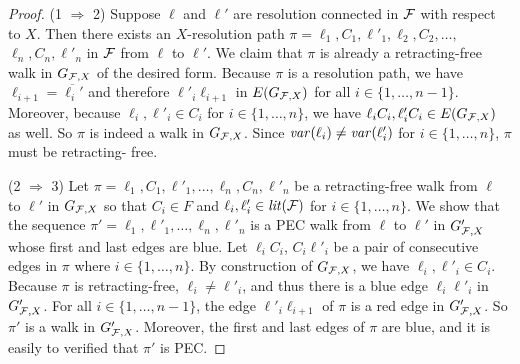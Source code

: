 \documentclass{llncs}
\def\hy{\hbox{-}\nobreak\hskip0pt} \newcommand{\ellipsis}{$\dots$}
\begin{document}
\begin{proof}
  (1 $\Rightarrow$ 2) Suppose $\ell$ and $\ell'$ are resolution connected in $\mathcal{F}$
  with respect to $X$. Then there exists an $X$\hy resolution path $\pi =
  \ell_1,C_1,\ell'_1,\ell_2,C_2,\dots,$\hskip 0pt$\ell_n,C_n,\ell'_n$ in
  $\mathcal{F}$ from $\ell$ to $\ell'$. We claim that $\pi$ is already a
  retracting\hy free walk in $G_{\mathcal{F},X}$ of the desired form. Because $\pi$
  is a resolution path, we have $\ell_{i+1} = \overline{\ell_i'}$ and
  therefore $\ell'_i\ell_{i+1}$ in $E(G_{\mathcal{F}, X})$ for all $i \in \{ 1,
  \dots, n-1 \}$. Moreover, because $\ell_i,\ell'_i \in C_i$ for $i \in \{
  1, \dots, n \}$, we have $\ell_iC_i, \ell'_iC_i \in E(G_{\mathcal{F}, X})$ as
  well. So $\pi$ is indeed a walk in $G_{\mathcal{F},X}$. Since $\mathit{var}(\ell_i) \neq
  \mathit{var}(\ell'_i)$ for $i \in \{ 1, \dots, n \}$, $\pi$ must be retracting\hy
  free.

  (2 $\Rightarrow$ 3) Let $\pi = \ell_1, C_1, \ell'_1, \dots, \ell_n,C_n,
  \ell'_n$ be a retracting\hy free walk from $\ell$ to $\ell'$ in $G_{\mathcal{F},X}$
  so that $C_i \in F$ and $\ell_i, \ell'_i \in \mathit{lit}(\mathcal{F})$ for $i \in \{ 1,
  \dots, n \}$. We show that the sequence $\pi' = \ell_1, \ell'_1, \dots,
  \ell_n,\ell'_n$ is a PEC walk from $\ell$ to $\ell'$ in
  $G'_{\mathcal{F},X}$ whose first and last edges are blue. Let $\ell_iC_i$,
  $C_i\ell'_i$ be a pair of consecutive edges in $\pi$ where $i \in \{ 1,
  \dots, n \}$. By construction of $G_{\mathcal{F},X}$, we have $\ell_i,\ell'_i \in
  C_i$. Because $\pi$ is retracting\hy free, $\ell_i \neq \ell'_i$, and thus
  there is a blue edge $\ell_i\ell'_i$ in $G'_{\mathcal{F},X}$. For all $i \in \{1,
  \dots, n-1\}$, the edge $\ell'_i\ell_{i+1}$ of $\pi$ is a red edge in
  $G'_{\mathcal{F},X}$. So $\pi'$ is a walk in $G'_{\mathcal{F},X}$. Moreover, the first and
  last edges of $\pi$ are blue, and it is easily to verified that $\pi'$ is
  PEC.


\end{proof}
\end{document}
